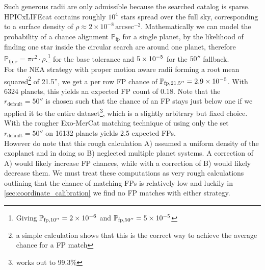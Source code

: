 Such generous radii are only admissible because the searched catalog is sparse. HPICxLIFEcat contains roughly $10^4$ stars spread over the full sky, corresponding to a surface density of $\rho\approx 2\times10^{-8} \,\text{arcsec}^{-2}$. Mathematically we can model the probability of a chance alignment $\mathbb P_{\text{fp}}$ for a single planet, by the likelihood of finding one star inside the circular search are around one planet, therefore $\mathbb P_{\text{fp}, r} = \pi r^2 \cdot \rho$.\footnote{Giving $\mathbb P_{\text{fp}, 10''} = \num{2E-6}$ and $\mathbb P_{\text{fp}, 50''} = \num{5E-5}$ } for the base tolerance and $\num{5E-5}$ for the $50''$ fallback.\\
For the NEA strategy with proper motion aware radii forming a root mean squared\footnote{a simple calculation shows that this is the correct way to achieve the average chance for a FP match} of 21.5'', we get a per row FP chance of $\mathbb P_{\text{fp}, 21.5''} = \num{2.9E-5}$. With 6324 planets, this yields an expected FP count of $0.18$. Note that the $r_{\text{default}} = 50''$ is chosen such that the chance of an FP stays just below one if we applied it to the entire dataset\footnote{works out to 99.3\%}, which is a slightly arbitrary but fixed choice.\\
With the rougher Exo-MerCat matching technique of using only the set $r_\text{default} = 50''$ on 16132 planets yields 2.5 expected FPs.\\
However do note that this rough calculation A) assumed a uniform density of the exoplanet and in doing so B) neglected multiple planet systems. A correction of A) would likely increase FP chances, while with a correction of B) would likely decrease them. We must treat these computations as very rough calculations outlining that the chance of matching FPs is relatively low and luckily in \cref{sec:coordinate_calibration} we find no FP matches with either strategy.
 \label{par:density_calc}
